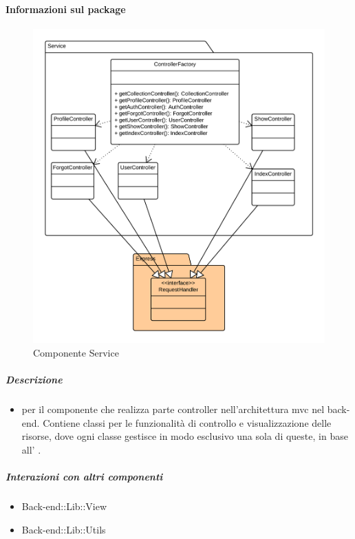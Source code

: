	\paragraph{Informazioni sul package} 
		\begin{figure}[H] 
			\begin{center} 
				\includegraphics[width=\textwidth]{uml/package/Back-end::Lib::Controller::Service.png}  
				\caption{Componente Service}
			\end{center}  
		\end{figure} 
	\subparagraph{Descrizione} 
		\begin{itemize}
		\item[]  per il componente che realizza parte controller nell’architettura mvc nel back-
end. Contiene classi per le funzionalità di controllo e visualizzazione delle risorse, dove ogni
classe gestisce in modo esclusivo una sola di queste, in base all’  .

		\end{itemize} 
	\subparagraph{Interazioni con altri componenti} 
		\begin{itemize} 
				\item Back-end::Lib::View
				\item Back-end::Lib::Utils  
		\end{itemize} 

